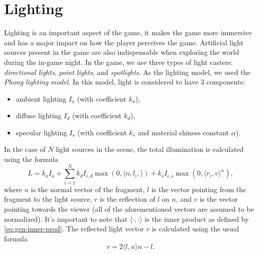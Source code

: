 \section{Lighting}\label{sec:theory_theory_lighting}
Lighting is an important aspect of the game, it makes the game more immersive and has a major impact on how the player perceives the game.
Artificial light sources present in the game are also indispensable when exploring the world during the in-game night.
In the game, we use three types of light casters: \textit{directional lights}, \textit{point lights}, and \textit{spotlights}.
As the lighting model, we used the \textit{Phong lighting model}.
In this model, light is considered to have 3 components:
\begin{itemize}
    \item ambient lighting $I_a$ (with coefficient $k_a$),
    \item diffuse lighting $I_d$ (with coefficient $k_d$),
    \item specular lighting $I_s$ (with coefficient $k_s$ and material shiness constant $\alpha$).
\end{itemize}
In the case of $N$ light sources in the scene, the total illumination is calculated using the formula
\begin{equation}
    L = k_a I_a + \sum_{i = 1}^N {k_d I_{i, d} \max(0, \langle n, l_i, \rangle) + k_s I_{i, s} \max(0, \langle r_i, v \rangle^\alpha )},
\end{equation}
where $n$ is the normal vector of the fragment, $l$ is the vector pointing from the fragment to the light source, $r$ is the reflection of $l$ on $n$, and $v$ is the vector pointing towards the viewer (all of the aforementioned vectors are assumed to be normalized).
It's important to note that $\langle \cdot, \cdot\rangle$ is the inner product as defined by \autoref{eq:gen-inner-prod}.
The reflected light vector $r$ is calculated using the usual formula
\begin{equation*}
    r = 2 \langle l, n \rangle n - l.
\end{equation*}



